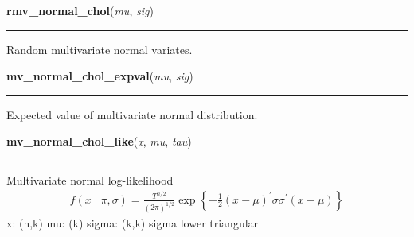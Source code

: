     \begin{boxedminipage}{\textwidth}

    \raggedright \textbf{rmv\_normal\_chol}(\textit{mu}, \textit{sig})

    \vspace{-1.5ex}

    \rule{\textwidth}{0.5\fboxrule}

Random multivariate normal variates.
    \vspace{1ex}

    \end{boxedminipage}

    \label{pymc:distributions:mv_normal_chol_expval}

    \vspace{0.5ex}

    \begin{boxedminipage}{\textwidth}

    \raggedright \textbf{mv\_normal\_chol\_expval}(\textit{mu}, \textit{sig})

    \vspace{-1.5ex}

    \rule{\textwidth}{0.5\fboxrule}

Expected value of multivariate normal distribution.
    \vspace{1ex}

    \end{boxedminipage}

    \label{pymc:distributions:mv_normal_chol_like}

    \vspace{0.5ex}

    \begin{boxedminipage}{\textwidth}

    \raggedright \textbf{mv\_normal\_chol\_like}(\textit{x}, \textit{mu}, \textit{tau})

    \vspace{-1.5ex}

    \rule{\textwidth}{0.5\fboxrule}

Multivariate normal log-likelihood
\begin{equation*}\begin{split}f(x \mid \pi, \sigma) = \frac{T^{n/2}}{(2\pi)^{1/2}} \exp\left\{ -\frac{1}{2} (x-\mu)^{\prime}\sigma \sigma^{\prime}(x-\mu) \right\}\end{split}\end{equation*}
x: (n,k)
mu: (k)
sigma: (k,k)
sigma lower triangular
    \vspace{1ex}

    \end{boxedminipage}

